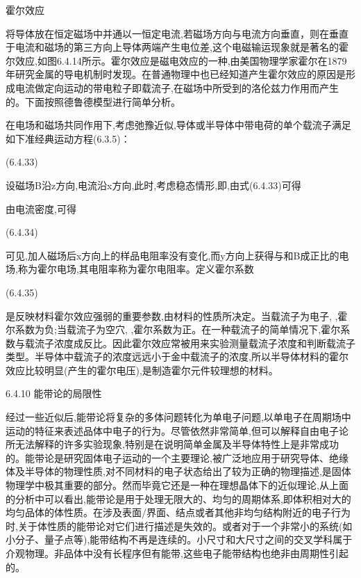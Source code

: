 霍尔效应

将导体放在恒定磁场中并通以一恒定电流,若磁场方向与电流方向垂直，则在垂直于电流和磁场的第三方向上导体两端产生电位差,这个电磁输运现象就是著名的霍尔效应,如图6.4.14所示。霍尔效应是磁电效应的一种,由美国物理学家霍尔在1879年研究金属的导电机制时发现。在普通物理中也已经知道产生霍尔效应的原因是形成电流做定向运动的带电粒子即载流子,在磁场中所受到的洛伦兹力作用而产生的。下面按照德鲁德模型进行简单分析。

在电场和磁场共同作用下,考虑弛豫近似,导体或半导体中带电荷的单个载流子满足如下准经典运动方程(6.3.5)：

 	(6.4.33)

设磁场B沿z方向,电流沿x方向,此时,考虑稳态情形,即,由式(6.4.33)可得



由电流密度,可得

 	(6.4.34)

可见,加人磁场后x方向上的样品电阻率没有变化,而y方向上获得与和B成正比的电场,称为霍尔电场,其电阻率称为霍尔电阻率。定义霍尔系数

	 (6.4.35)

是反映材料霍尔效应强弱的重要参数,由材料的性质所决定。当载流子为电子, ,霍尔系数为负;当载流子为空穴, ,霍尔系数为正。在一种载流子的简单情况下,霍尔系数与载流子浓度成反比。因此霍尔效应常被用来实验测量载流子浓度和判断载流子类型。半导体中载流子的浓度远远小于金中载流子的浓度,所以半导体材料的霍尔效应比较明显(产生的霍尔电压),是制造霍尔元件较理想的材料。



6.4.10 能带论的局限性

经过一些近似后,能带论将复杂的多体问题转化为单电子问题,以单电子在周期场中运动的特征来表述品体中电子的行为。尽管依然非常简单,但可以解释自由电子论所无法解释的许多实验现象,特别是在说明简单金属及半导体特性上是非常成功的。能带论是研究固体电子运动的一个主要理论,被广泛地应用于研究导体、绝缘体及半导体的物理性质,对不同材料的电子状态给出了较为正确的物理描述,是固体物理学中极其重要的部分。然而毕竟它还是一种在理想晶体下的近似理论,从上面的分析中可以看出,能带论是用于处理无限大的、均匀的周期体系,即体积相对大的均匀品体的体性质。在涉及表面/界面、结点或者其他非均匀结构附近的电子行为时,关于体性质的能带论对它们进行描述是失效的。或者对于一个非常小的系统(如小分子、量子点等),能带结构不再是连续的。小尺寸和大尺寸之间的交叉学科属于介观物理。非品体中没有长程序但有能带,这些电子能带结构也绝非由周期性引起的。

